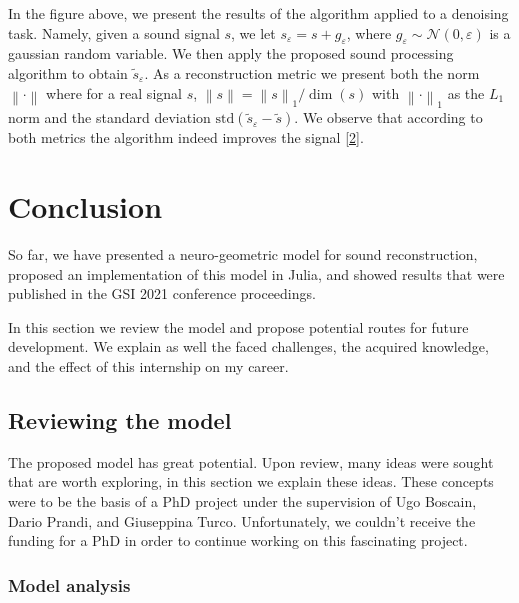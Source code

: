 \documentclass[american,]{article}
\theoremstyle{definition}
\theoremstyle{definition}
\theoremstyle{definition}
\theoremstyle{remark}
\begin{document}
In the figure above, we present the results of the algorithm applied to a denoising task.
Namely, given a sound signal \(s\), we let \(s_\varepsilon= s + g_\varepsilon\),
where \(g_\varepsilon\sim \mathcal N(0,\varepsilon)\) is a gaussian random variable.
We then apply the proposed sound processing algorithm to obtain \(\tilde s_\varepsilon\).
As a reconstruction metric we present both the norm \(\left\lVert\cdot\right\rVert\)
where for a real signal \(s\), \(\left\lVert s\right\rVert = \left\lVert s\right\rVert_1/\dim(s)\)
with \(\left\lVert\cdot\right\rVert_1\) as the \(L_1\) norm
and the standard deviation \(\mathrm{std}(\tilde s_\varepsilon -\tilde s)\).
We observe that according to both metrics the algorithm indeed improves the signal {[}\protect\hyperlink{ref-asswad2021}{2}{]}.

\pagebreak

\hypertarget{conclusion}{%
\section{Conclusion}\label{conclusion}}

So far, we have presented a neuro-geometric model for sound reconstruction,
proposed an implementation of this model in Julia,
and showed results that were published in the GSI 2021 conference proceedings.

In this section we review the model and propose potential
routes for future development.
We explain as well the faced challenges, the acquired knowledge,
and the effect of this internship on my career.

\hypertarget{reviewing-the-model}{%
\subsection{Reviewing the model}\label{reviewing-the-model}}

The proposed model has great potential.
Upon review, many ideas were sought that are worth exploring,
in this section we explain these ideas.
These concepts were to be the basis of a PhD project
under the supervision of Ugo Boscain, Dario Prandi, and Giuseppina Turco.
Unfortunately, we couldn't receive the funding for a PhD
in order to continue working on this fascinating project.

\hypertarget{model-analysis}{%
\subsubsection{Model analysis}\label{model-analysis}}
\end{document}
